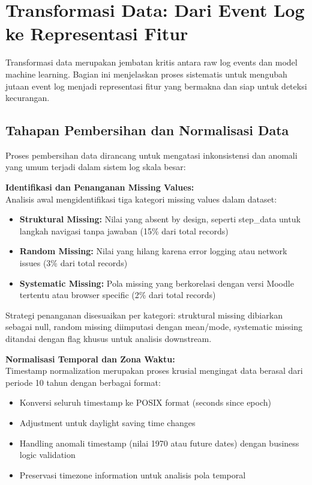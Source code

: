 \section{Transformasi Data: Dari Event Log ke Representasi Fitur}
\label{sec:transformasiData}

Transformasi data merupakan jembatan kritis antara raw log events dan model machine learning. Bagian ini menjelaskan proses sistematis untuk mengubah jutaan event log menjadi representasi fitur yang bermakna dan siap untuk deteksi kecurangan.

\subsection{Tahapan Pembersihan dan Normalisasi Data}
\label{sec:pembersihanNormalisasi}

Proses pembersihan data dirancang untuk mengatasi inkonsistensi dan anomali yang umum terjadi dalam sistem log skala besar:

\textbf{Identifikasi dan Penanganan Missing Values:} \\
Analisis awal mengidentifikasi tiga kategori missing values dalam dataset:
\begin{itemize}
    \item \textbf{Struktural Missing:} Nilai yang absent by design, seperti step\_data untuk langkah navigasi tanpa jawaban (15\% dari total records)
    \item \textbf{Random Missing:} Nilai yang hilang karena error logging atau network issues (3\% dari total records)
    \item \textbf{Systematic Missing:} Pola missing yang berkorelasi dengan versi Moodle tertentu atau browser specific (2\% dari total records)
\end{itemize}

Strategi penanganan disesuaikan per kategori: struktural missing dibiarkan sebagai null, random missing diimputasi dengan mean/mode, systematic missing ditandai dengan flag khusus untuk analisis downstream.

\textbf{Normalisasi Temporal dan Zona Waktu:} \\
Timestamp normalization merupakan proses krusial mengingat data berasal dari periode 10 tahun dengan berbagai format:
\begin{itemize}
    \item Konversi seluruh timestamp ke POSIX format (seconds since epoch)
    \item Adjustment untuk daylight saving time changes
    \item Handling anomali timestamp (nilai 1970 atau future dates) dengan business logic validation
    \item Preservasi timezone information untuk analisis pola temporal
\end{itemize}

